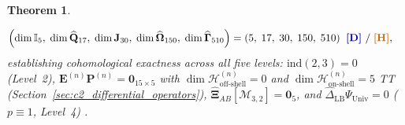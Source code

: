 \documentclass[11pt,a4paper]{article}
\newcommand{\catD}{\text{\textbf{\textcolor{blue!75!black}{[D]}}}}
\newcommand{\catH}{\text{\textbf{\textcolor{orange!80!black}{[H]}}}}
\theoremstyle{definition}
\theoremstyle{plain}
\newtheorem{theorem}[axiom]{Theorem}
\theoremstyle{remark}
\begin{document}
\begin{theorem}
\begin{enumerate}[label=(\roman*)]
\begin{align}
  \left(\dim\mathbb{I}_5,\; \dim\widehat{\mathbf{Q}}_{17},\; \dim\mathbf{J}_{30},\; \dim\widehat{\bm{\Omega}}_{150},\; \dim\widehat{\bm{\Gamma}}_{510}\right) &= (5,\; 17,\; 30,\; 150,\; 510) \;\;\catD\ / \;\catH, \label{eq:c6_operator_pyramid_dims}
  \end{align}
  establishing cohomological exactness across all five levels: $\mathrm{ind}(2,3) = 0$ (Level~2), $\mathbf{E}^{(n)}\mathbf{P}^{(n)} = \mathbf{0}_{15\times 5}$ with $\dim\mathcal{H}_{\mathrm{off\text{-}shell}}^{(n)} = 0$ and $\dim\mathcal{H}_{\mathrm{on\text{-}shell}}^{(n)} = 5$ TT (Section~\ref{sec:c2_differential_operators}), $\widehat{\bm{\Xi}}_{AB}[\mathcal{M}_{3,2}] = \mathbf{0}_5$, and $\widehat{\Delta}_{\mathrm{LB}}\Psi_{\mathrm{Univ}} = 0$ ($p \equiv 1$, Level~4) \catD.
\end{enumerate}
\end{theorem}
\end{document}
